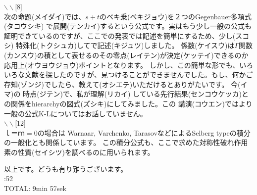 \documentclass[11pt]{article} %
\newcommand{\slide}[1]{\noindent$\backslash\backslash$[#1]\\}
\newcommand{\mytime}[1]{\noindent #1\\}
\newcommand{\kana}[2]{#1{\scriptsize (#2)}}
\newcommand{\doubt}[1]{\fbox{#1}}
\begin{document}
\slide{8}
次の\kana{命題}{メイダイ}では、$s+t$の\kana{ベキ乗}{ベキジョウ}を２つのGegenbauer\kana{多項式}{タコウシキ}
で\kana{展開}{テンカイ}するという公式です。実はもう少し一般の公式も証明できているのですが、ここでの発表では記述を簡単にするため、\kana{少し}{スコシ}
\kana{特殊化}{トクシュカ}してで\kana{記述}{キジュツ}しました。
\kana{係数}{ケイスウ}は$\Gamma$\kana{関数}{カンスウ}の積として表せるの\doubt{つこ}その\kana{零点}{レイテン}が\kana{決定}{ケッテイ}できるのか\kana{応用上}{オウヨウジョウ}ポイントとなります。
しかし、この簡単な形でも、いろいろな文献を探したのですが、見つけることができませんでした。もし、何かご\kana{存知}{ゾンジ}でしたら、\kana{教えて}{オシエテ}いただけるとありがたいです。
\kana{今}{イマ}の
\kana{時点}{ジテン}で、私が\kana{理解}{リカイ}
している\kana{先行結果}{センコウケッカ}との関係をhierarchyの\kana{図式}{ズシキ}にしてみました。この
\kana{講演}{コウエン}ではより一般の公式K-Lについてはお話していません。\\

\slide{12}
$ｌ＝ｍ=0$の場合は Warnaar, Varchenko, TarasovなどによるSelberg typeの積分の一般化とも関係しています。
この積分公式も、ここで求めた対称性破れ作用素の\kana{性質}{セイシツ}を調べるのに用いられます。

\noindent 以上です。どうも有り難うございます。\\
\mytime{0:52}

TOTAL: 9min 57sek
\end{document}
